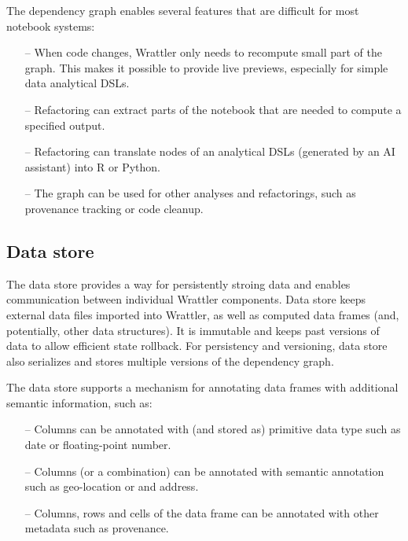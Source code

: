 \documentclass[sigplan,preprint,10pt]{acmart}\settopmatter{printfolios=true,printccs=false,printacmref=false}
\theoremstyle{plain}
\theoremstyle{definition}
\begin{document}
The dependency graph enables several features that are difficult for most notebook systems:
%
\begin{itemize}
\item[--] When code changes, Wrattler only needs to recompute small part of the graph.
  This makes it possible to provide live previews, especially for simple data analytical DSLs.
\vspace{-0.85em}
\item[--] Refactoring can extract parts of the notebook that
  are needed to compute a specified output.
\vspace{0.25em}
\item[--] Refactoring can translate nodes of an analytical DSLs (generated by an AI assistant) into R or Python.
\vspace{0.25em}
\item[--] The graph can be used for other analyses and refactorings, such as provenance tracking
  or code cleanup.
\end{itemize}

\subsection{Data store}

The data store provides a way for persistently stroing data and enables communication between 
individual Wrattler components. Data store keeps external data files imported into Wrattler,
as well as computed data frames (and, potentially, other data structures). It is immutable 
and keeps past versions of data to allow efficient state rollback. For persistency and versioning, 
data store also serializes and stores multiple versions of the dependency graph.

The data store supports a mechanism for annotating data frames with additional semantic information, such as:
%
\begin{itemize}
\item[--] Columns can be annotated with (and stored as) primitive data type such as date or floating-point number.
\vspace{0.25em}
\item[--] Columns (or a combination) can be annotated with semantic annotation such as geo-location or and address.
\vspace{-0.85em}
\item[--] Columns, rows and cells of the data frame can be annotated with other metadata such as provenance.
\end{itemize}
\end{document}
